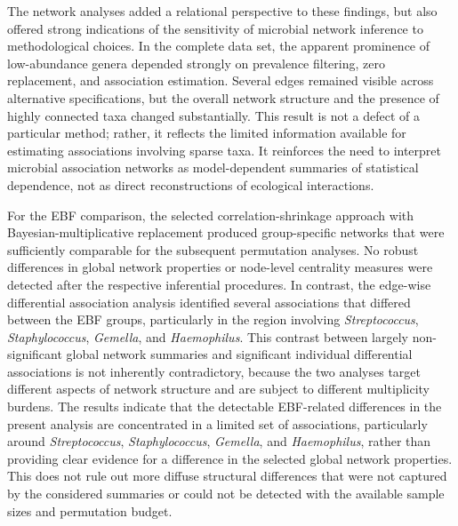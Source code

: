 The network analyses added a relational perspective to these findings, but also offered strong indications of the sensitivity of microbial network inference to methodological choices. In the complete data set, the apparent prominence of low-abundance genera depended strongly on prevalence filtering, zero replacement, and association estimation. Several edges remained visible across alternative specifications, but the overall network structure and the presence of highly connected taxa changed substantially. This result is not a defect of a particular method; rather, it reflects the limited information available for estimating associations involving sparse taxa. It reinforces the need to interpret microbial association networks as model-dependent summaries of statistical dependence, not as direct reconstructions of ecological interactions.

For the EBF comparison, the selected correlation-shrinkage approach with Bayesian-multiplicative replacement produced group-specific networks that were sufficiently comparable for the subsequent permutation analyses. No robust differences in global network properties or node-level centrality measures were detected after the respective inferential procedures. In contrast, the edge-wise differential association analysis identified several associations that differed between the EBF groups, particularly in the region involving \emph{Streptococcus}, \emph{Staphylococcus}, \emph{Gemella}, and \emph{Haemophilus}. This contrast between largely non-significant global network summaries and significant individual differential associations is not inherently contradictory, because the two analyses target different aspects of network structure and are subject to different multiplicity burdens. The results indicate that the detectable EBF-related differences in the present analysis are concentrated in a limited set of associations, particularly around \emph{Streptococcus}, \emph{Staphylococcus}, \emph{Gemella}, and \emph{Haemophilus}, rather than providing clear evidence for a difference in the selected global network properties. This does not rule out more diffuse structural differences that were not captured by the considered summaries or could not be detected with the available sample sizes and permutation budget.

